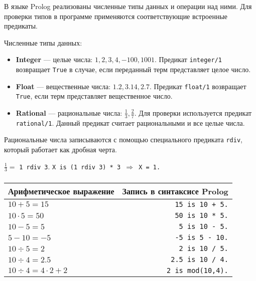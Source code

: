 \begin{frame}

	\frametitle{\insertsection}
	\framesubtitle{\insertsubsection}
	
	В языке Prolog реализованы численные типы данных и операции над ними.
	Для проверки типов в программе применяются соответствующие встроенные предикаты.
	
	Численные типы данных:
	
	\begin{itemize}
		\item \textbf{Integer} --- целые числа: \(1, 2, 3, 4, -100, 1001 \). Предикат \texttt{integer/1} возвращает \texttt{True} в случае, если переданный терм представляет целое число.
		\item \textbf{Float} --- вещественные числа: \(1.2, 3.14, 2.7 \). Предикат \texttt{float/1} возвращает \texttt{True}, если терм представляет вещественное число.
		\item \textbf{Rational} --- рациональные числа: \(\frac{1}{3}, \frac{2}{7} \). Для проверки используется предикат \texttt{rational/1}. Данный предикат считает рациональными и все целые числа.
	\end{itemize}

	Рациональные числа записываются с помощью специального предиката \texttt{rdiv}, который работает как дробная черта.
	
	\begin{rexample}
		\(\frac{1}{3}  = \) \texttt{1 rdiv 3}.
		\texttt{X is (1 rdiv 3) * 3 \( \Rightarrow \) X = 1.}
	\end{rexample}

\end{frame}


\begin{frame}
		
		\frametitle{\insertsection}
		\framesubtitle{\insertsubsection}
		
		\begin{table}
			\centering
			\begin{tabular}{ l | r }
				\rowcolor{Gray}
				\textbf{Арифметическое выражение} & \textbf{Запись в синтаксисе Prolog} \\
				\hline
				\rowcolor{LightGray}\( 10 + 5 = 15 \) & \texttt{15 is 10 + 5.}   \\
				\rowcolor{LightGray}\( 10\cdot 5 = 50 \)  & \texttt{50 is 10 * 5.}   \\
				\rowcolor{LightGray}\( 10 - 5 = 5 \)  & \texttt{5 is 10 - 5.}   \\
				\rowcolor{LightGray}\( 5 - 10 = -5 \)  & \texttt{-5 is 5 - 10.}   \\
				\rowcolor{LightGray}\( 10\div 5 = 2 \)  & \texttt{2 is 10 / 5.}   \\
				\rowcolor{LightGray}\( 10\div 4 = 2.5 \)  & \texttt{2.5 is 10 / 4.}   \\
				\rowcolor{LightGray}\( 10\div 4 = 4\cdot 2 + 2 \)  & \texttt{2 is mod(10,4).}  \\
			\end{tabular}
		\end{table}
		
\end{frame}


